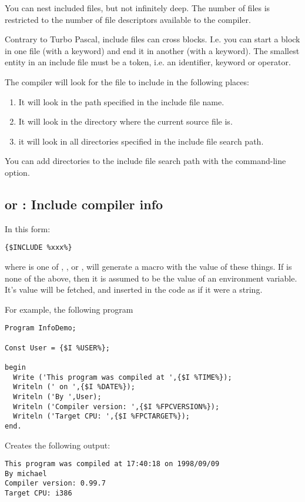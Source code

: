 You can nest included files, but not infinitely deep. The number of files is
restricted to the number of file descriptors available to the \fpc compiler.

Contrary to Turbo Pascal, include files can cross blocks. I.e. you can start
a block in one file (with a  keyword) and end it in another (with
a  keyword). The smallest entity in an include file must be a token,
i.e. an identifier, keyword or operator.

The compiler will look for the file to include in the following places:

\begin{enumerate}
\item It will look in the path specified in the include file name.
\item It will look in the directory where the current source file is.
\item it will look in all directories specified in the include file search
path.
\end{enumerate}
You can add directories to the include file search path with the 
command-line option.

\subsection{ or  : Include compiler info}

In this form:
\begin{verbatim}
{$INCLUDE %xxx%}
\end{verbatim}
where  is one of , ,  or
, will generate a macro with the value of these things.
If  is none of the above, then it is assumed to be the value of
an environment variable. It's value will be fetched, and inserted in the code
as if it were a string.

For example, the following program
\begin{verbatim}
Program InfoDemo;

Const User = {$I %USER%};

begin
  Write ('This program was compiled at ',{$I %TIME%});
  Writeln (' on ',{$I %DATE%});
  Writeln ('By ',User);
  Writeln ('Compiler version: ',{$I %FPCVERSION%});
  Writeln ('Target CPU: ',{$I %FPCTARGET%});
end.
\end{verbatim}
Creates the following output:
\begin{verbatim}
This program was compiled at 17:40:18 on 1998/09/09
By michael
Compiler version: 0.99.7
Target CPU: i386
\end{verbatim}

